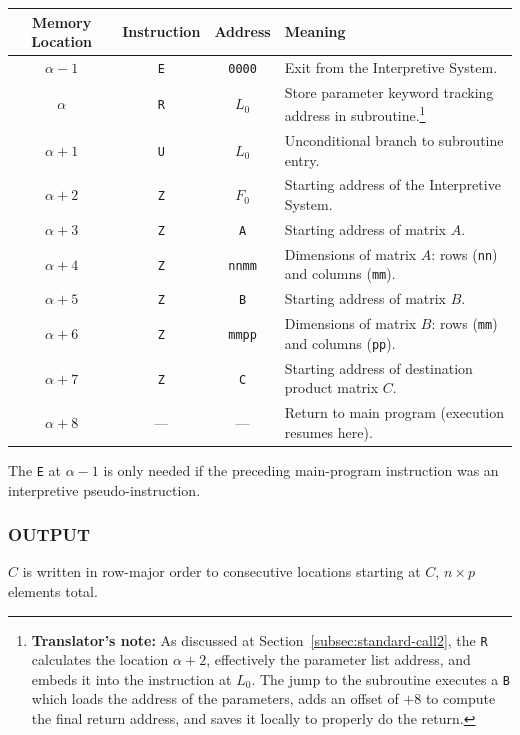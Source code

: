 \medskip
\begin{table}[h!]
\centering
\begin{tabularx}{\textwidth}{cccX}
\toprule
\textbf{Memory Location} & \textbf{Instruction} & \textbf{Address} & \textbf{Meaning} \\
\midrule
$\alpha - 1$      & \texttt{E}      & \texttt{0000}    & Exit from the Interpretive System. \\
$\alpha$          & \texttt{R}      & \texttt{$L_0$}   & Store parameter keyword tracking address in subroutine.\footnote{\textbf{Translator's note:} As discussed at Section~\ref{subsec:standard-call2}, the \texttt{R} calculates the location $\alpha+2$, effectively the parameter list address, and embeds it into the instruction at \texttt{$L_0$}. The jump to the subroutine executes a \texttt{B} which loads the address of the parameters, adds an offset of $+8$ to compute the final return address, and saves it locally to properly do the return.} \\
$\alpha + 1$      & \texttt{U}      & \texttt{$L_0$}   & Unconditional branch to subroutine entry. \\
$\alpha + 2$      & \texttt{Z}      & \texttt{$F_0$}   & Starting address of the Interpretive System. \\
$\alpha + 3$      & \texttt{Z}      & \texttt{A}       & Starting address of matrix $A$. \\
$\alpha + 4$      & \texttt{Z}      & \texttt{nnmm}    & Dimensions of matrix $A$: rows (\texttt{nn}) and columns (\texttt{mm}). \\
$\alpha + 5$      & \texttt{Z}      & \texttt{B}       & Starting address of matrix $B$. \\
$\alpha + 6$      & \texttt{Z}      & \texttt{mmpp}    & Dimensions of matrix $B$: rows (\texttt{mm}) and columns (\texttt{pp}). \\
$\alpha + 7$      & \texttt{Z}      & \texttt{C}       & Starting address of destination product matrix $C$. \\
$\alpha + 8$      & ---              & ---              & Return to main program (execution resumes here). \\
\bottomrule
\end{tabularx}
\end{table}

\medskip
\noindent
The \texttt{E} at $\alpha-1$ is only needed if the preceding main-program instruction was an interpretive pseudo-instruction.

\subsubsection*{OUTPUT}
$C$ is written in row-major order to consecutive locations starting at $C$, $n \times p$ elements total.


